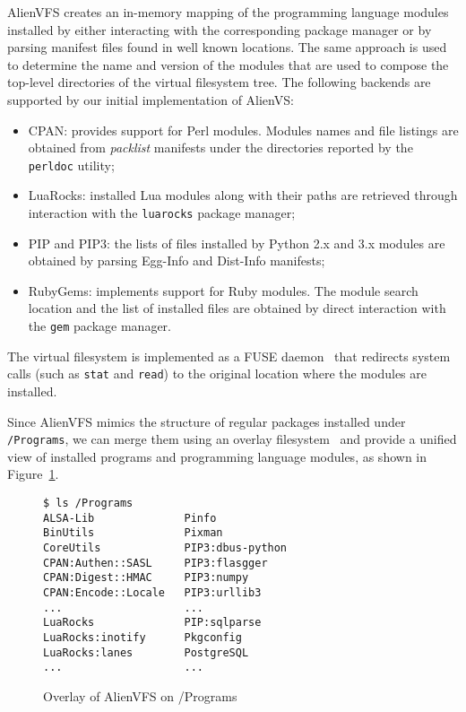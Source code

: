 \documentclass[sigplan, anonymous, 10pt]{acmart}
\begin{document}
AlienVFS creates an in-memory mapping of the programming language modules installed
by either interacting with the corresponding package manager or by parsing manifest
files found in well known locations. The same approach is used to determine the
name and version of the modules that are used to compose the top-level directories
of the virtual filesystem tree. The following backends are supported by our initial
implementation of AlienVS:

\begin{itemize}
    \item CPAN: provides support for Perl modules. Modules names and file listings
        are obtained from \emph{packlist} manifests under the directories reported
        by the \texttt{perldoc} utility;
    \item LuaRocks: installed Lua modules along with their paths are retrieved
        through interaction with the \texttt{luarocks} package manager;
    \item PIP and PIP3: the lists of files installed by Python 2.x and 3.x modules
        are obtained by parsing Egg-Info and Dist-Info manifests;
    \item RubyGems: implements support for Ruby modules. The module search location
        and the list of installed files are obtained by direct interaction with the
        \texttt{gem} package manager.
\end{itemize}

The virtual filesystem is implemented as a FUSE daemon~\cite{miklos2001:fuse} that
redirects system calls (such as \texttt{stat} and \texttt{read}) to the original
location where the modules are installed.

Since AlienVFS mimics the structure of regular packages installed under
\texttt{/Programs}, we can merge them using an overlay filesystem~\cite{brown2018:overlayfs}
and provide a unified view of installed programs and programming language modules, as
shown in Figure~\ref{fig:alienvfs.merged}.

\begin{figure}[h]
    \begin{Verbatim}[frame=single]
$ ls /Programs
ALSA-Lib              Pinfo
BinUtils              Pixman
CoreUtils             PIP3:dbus-python
CPAN:Authen::SASL     PIP3:flasgger
CPAN:Digest::HMAC     PIP3:numpy
CPAN:Encode::Locale   PIP3:urllib3
...                   ...
LuaRocks              PIP:sqlparse
LuaRocks:inotify      Pkgconfig
LuaRocks:lanes        PostgreSQL
...                   ...
    \end{Verbatim}
    \caption{Overlay of AlienVFS on /Programs}
    \label{fig:alienvfs.merged}
\end{figure}
\end{document}
